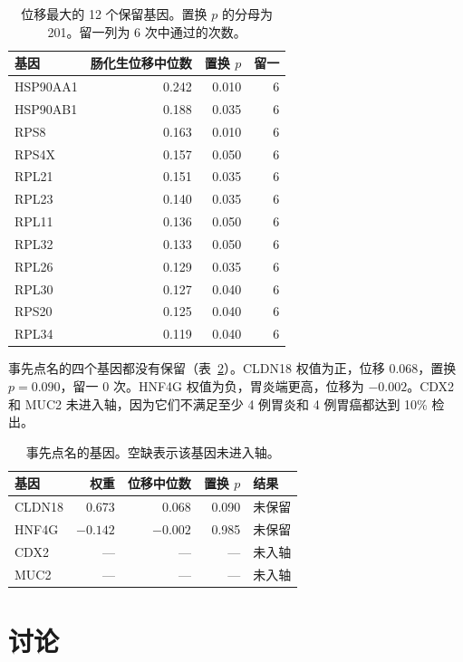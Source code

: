 \documentclass[12pt,a4paper,fontset=none]{ctexart}
\begin{document}
\begin{table}[htbp]
  \centering
  \caption{位移最大的 12 个保留基因。置换 \(p\) 的分母为 201。留一列为 6 次中通过的次数。}
  \label{tab:top}
  \small
  \begin{tabular}{lrrr}
    \toprule
    基因 & 肠化生位移中位数 & 置换 \(p\) & 留一 \\
    \midrule
    HSP90AA1 & 0.242 & 0.010 & 6 \\
    HSP90AB1 & 0.188 & 0.035 & 6 \\
    RPS8     & 0.163 & 0.010 & 6 \\
    RPS4X    & 0.157 & 0.050 & 6 \\
    RPL21    & 0.151 & 0.035 & 6 \\
    RPL23    & 0.140 & 0.035 & 6 \\
    RPL11    & 0.136 & 0.050 & 6 \\
    RPL32    & 0.133 & 0.050 & 6 \\
    RPL26    & 0.129 & 0.035 & 6 \\
    RPL30    & 0.127 & 0.040 & 6 \\
    RPS20    & 0.125 & 0.040 & 6 \\
    RPL34    & 0.119 & 0.040 & 6 \\
    \bottomrule
  \end{tabular}
\end{table}

事先点名的四个基因都没有保留（表~\ref{tab:pre}）。CLDN18 权值为正，位移 0.068，置换 \(p=0.090\)，留一 0 次。HNF4G 权值为负，胃炎端更高，位移为 \(-0.002\)。CDX2 和 MUC2 未进入轴，因为它们不满足至少 4 例胃炎和 4 例胃癌都达到 10\% 检出。

\begin{table}[htbp]
  \centering
  \caption{事先点名的基因。空缺表示该基因未进入轴。}
  \label{tab:pre}
  \small
  \begin{tabular}{lrrrl}
    \toprule
    基因 & 权重 & 位移中位数 & 置换 \(p\) & 结果 \\
    \midrule
    CLDN18 & 0.673 & 0.068 & 0.090 & 未保留 \\
    HNF4G  & $-0.142$ & $-0.002$ & 0.985 & 未保留 \\
    CDX2   & --- & --- & --- & 未入轴 \\
    MUC2   & --- & --- & --- & 未入轴 \\
    \bottomrule
  \end{tabular}
\end{table}

\section{讨论}
\end{document}
